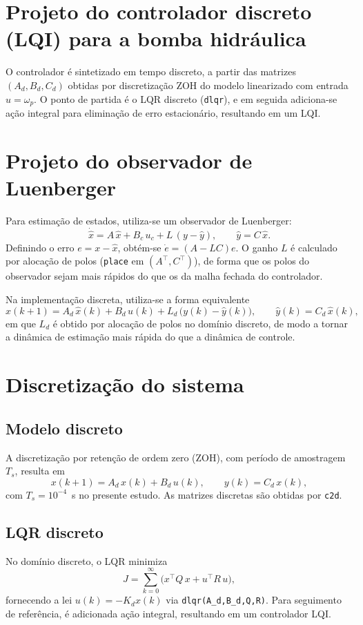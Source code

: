 \section{Projeto do controlador discreto (LQI) para a bomba hidráulica}
\label{sec:controle-lqr-luenberger}
O controlador é sintetizado em tempo discreto, a partir das matrizes $(A_d,B_d,C_d)$ obtidas por discretização ZOH do modelo linearizado com entrada $u=\omega_p$. O ponto de partida é o LQR discreto (\texttt{dlqr}), e em seguida adiciona-se ação integral para eliminação de erro estacionário, resultando em um LQI.
\section{Projeto do observador de Luenberger}
\label{sec:projeto-observador-luenberger}
Para estimação de estados, utiliza-se um observador de Luenberger:
\[
    \dot{\hat{x}} = A\,\hat{x} + B_c\,u_c + L\,(y-\hat{y}),
    \qquad \hat{y}=C\,\hat{x}.
\]
Definindo o erro $e=x-\hat{x}$, obtém-se $\dot{e}=(A-LC)e$. O ganho $L$ é calculado por alocação de polos (\texttt{place} em $(A^\top,C^\top)$), de forma que os polos do observador sejam mais rápidos do que os da malha fechada do controlador.

Na implementação discreta, utiliza-se a forma equivalente
\[
    \hat{x}(k+1)=A_d\,\hat{x}(k)+B_d\,u(k)+L_d\,\big(y(k)-\hat{y}(k)\big),\qquad \hat{y}(k)=C_d\,\hat{x}(k),
\]
em que $L_d$ é obtido por alocação de polos no domínio discreto, de modo a tornar a dinâmica de estimação mais rápida do que a dinâmica de controle.
\section{Discretização do sistema}
\label{sec:discretizacao-sistema}
\subsection{Modelo discreto}
\label{sec:modelo-discreto}
A discretização por retenção de ordem zero (ZOH), com período de amostragem $T_s$, resulta em
\[
    x(k+1)=A_d\,x(k)+B_d\,u(k),\qquad y(k)=C_d\,x(k),
\]
com $T_s=10^{-4}$~s no presente estudo. As matrizes discretas são obtidas por \texttt{c2d}.
\subsection{LQR discreto}
\label{sec:projeto-lqr-discreto}
No domínio discreto, o LQR minimiza
\[
    J=\sum_{k=0}^{\infty} \big(x^\top Q\,x + u^\top R\,u\big),
\]
fornecendo a lei $u(k)=-K_d x(k)$ via \texttt{dlqr(A\_d,B\_d,Q,R)}. Para seguimento de referência, é adicionada ação integral, resultando em um controlador LQI.
